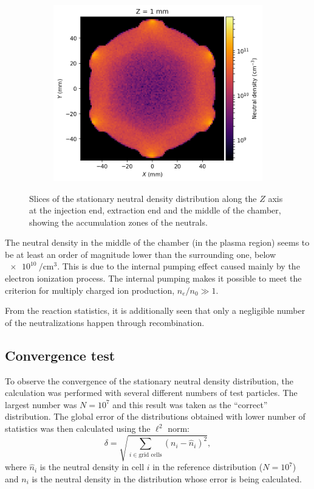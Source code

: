 \documentclass[a4paper,twoside,12pt]{article}
\begin{document}
\begin{figure}[t]
    \begin{subfigure}{0.5\textwidth}
        \centering
        \includegraphics[width=\linewidth]{images/stationary_z_middle.png}
    \end{subfigure}
    \caption{Slices of the stationary neutral density distribution along the
    $Z$ axis at the injection end, extraction end and the middle of the
    chamber, showing the accumulation zones of the neutrals.}
    \label{fig:stationary_z}
\end{figure}

The neutral density in the middle of the chamber (in the plasma region) seems to be at least an order of magnitude lower than the surrounding one, below $\SI{e10}{\per\centi\metre\cubed}$. This is due to the internal pumping effect caused mainly by the electron ionization process. The internal pumping makes it possible to meet the criterion for multiply charged ion production, $n_e / n_0 \gg 1$.

From the reaction statistics, it is additionally seen that only a negligible number of the neutralizations happen through recombination.

\subsection{Convergence test}
To observe the convergence of the stationary neutral density distribution, the calculation was performed with several different numbers of test particles. The largest number was $N = 10^{7}$ and this result was taken as the ``correct'' distribution. The global error of the distributions obtained with lower number of statistics was then calculated using the $\ell^2$ norm:
\begin{equation}
    \delta = \sqrt{\sum\limits_{i \in \text{grid cells}} (n_i - \hat{n}_i)^2},
\end{equation}
where $\hat{n}_i$ is the neutral density in cell $i$ in the reference distribution ($N = 10^{7}$) and $n_i$ is the neutral density in the distribution whose error is being calculated.
\end{document}
